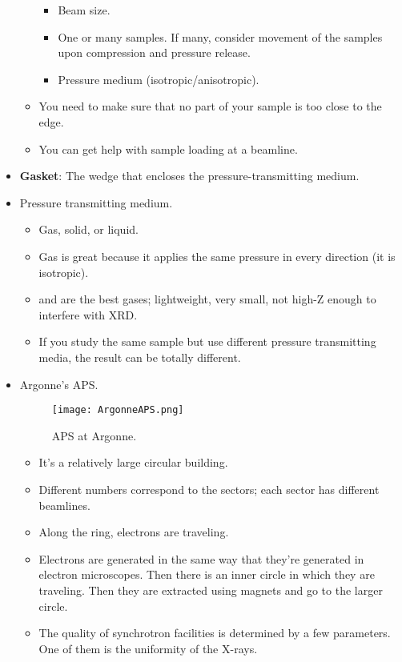 \documentclass[../notes.tex]{subfiles}
\begin{document}
\begin{itemize}
\begin{itemize}
\begin{itemize}
            \item Beam size.
            \item One or many samples. If many, consider movement of the samples upon compression and pressure release.
            \item Pressure medium (isotropic/anisotropic).
        \end{itemize}
        \item You need to make sure that no part of your sample is too close to the edge.
        \item You can get help with sample loading at a beamline.
    \end{itemize}
    \item \textbf{Gasket}: The wedge that encloses the pressure-transmitting medium.
    \item Pressure transmitting medium.
    \begin{itemize}
        \item Gas, solid, or liquid.
        \item Gas is great because it applies the same pressure in every direction (it is isotropic).
        \item {} and  are the best gases; lightweight, very small, not high-Z enough to interfere with XRD.
        \item If you study the same sample but use different pressure transmitting media, the result can be totally different.
    \end{itemize}
    \item Argonne's APS.
    \begin{figure}[H]
        \centering
        \texttt{[image: ArgonneAPS.png]}
        \caption{APS at Argonne.}
        \label{fig:ArgonneAPS}
    \end{figure}
    \begin{itemize}
        \item It's a relatively large circular building.
        \item Different numbers correspond to the sectors; each sector has different beamlines.
        \item Along the ring, electrons are traveling.
        \item Electrons are generated in the same way that they're generated in electron microscopes. Then there is an inner circle in which they are traveling. Then they are extracted using magnets and go to the larger circle.
        \item The quality of synchrotron facilities is determined by a few parameters. One of them is the uniformity of the X-rays.

\end{itemize}
\end{itemize}
\end{document}
